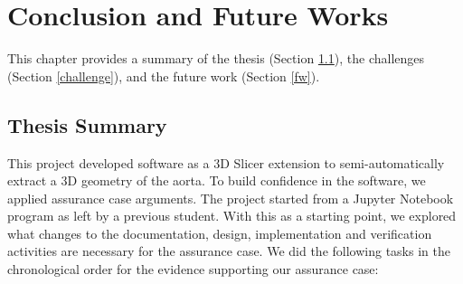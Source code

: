 \chapter{Conclusion and Future Works}

This chapter provides a summary of the thesis (Section \ref{thesis_sum}), the challenges (Section \ref{challenge}), and the future work (Section \ref{fw}).

\section{Thesis Summary}\label{thesis_sum}

This project developed software as a 3D Slicer extension to semi-automatically extract a 3D geometry of the aorta. To build confidence in the software, we applied assurance case arguments. The project started from a Jupyter Notebook program as left by a previous student. With this as a starting point, we explored what changes to the documentation, design, implementation and verification activities are necessary for the assurance case. We did the following tasks in the chronological order for the evidence supporting our assurance case:

